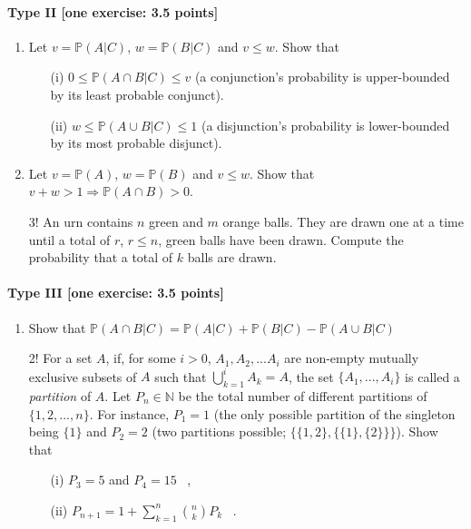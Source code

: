 \documentclass{article}
\begin{document}
\paragraph{Type II [one exercise: 3.5 points]}
\begin{enumerate}
	\item Let $v = \mathbb{P}(A|C)$, $w = \mathbb{P}(B|C)$ and $v \leq w$. Show that 
	\begin{itemize}
		\item [(i)] $0 \leq \mathbb{P}(A \cap B|C) \leq v$ (a conjunction's probability is upper-bounded by its least probable conjunct).	 \item[(ii)] $w \leq \mathbb{P}(A \cup B|C) \leq 1$ (a disjunction's probability is lower-bounded by its most probable disjunct).
	\end{itemize}
\item Let $v = \mathbb{P}(A)$, $w = \mathbb{P}(B)$ and $v \leq w$. Show that $v + w > 1 \Rightarrow \mathbb{P}(A \cap B) > 0$.
\item[3!] An urn contains $n$ green and $m$ orange balls. They are drawn one at a time until a total of $r$, $r \leq n$, green balls have been drawn. Compute the probability that a total of $k$ balls are drawn.

\end{enumerate}



\paragraph{Type III [one exercise: 3.5 points]}
\begin{enumerate}
	\item Show that $\mathbb{P}(A \cap B|C) = \mathbb{P}(A|C) + \mathbb{P}(B|C) - \mathbb{P}(A \cup B|C)$ %
	\item[2!] For a set $A$, if, for some $i > 0$, $A_1, A_2, ... A_i$ are non-empty mutually exclusive subsets of $A$ such that $\bigcup_{k=1}^{i}A_k = A$, the set $\{A_1, ..., A_i\}$ is called a \emph{partition} of $A$. Let $P_n \in \mathbb{N}$ be the total number of different partitions of $\{1,2,...,n\}$. For instance, $P_1 = 1$ (the only possible partition of the singleton being $\{1\}$ and $P_2 = 2$ (two partitions possible; $\{\{1,2\}, \{\{1\},\{2\}\}\}$). Show that
	\begin{itemize}
		\item[(i)] $P_3 = 5$ and $P_4 = 15$ \, ,
		\item[(ii)] $P_{n+1} = 1 + \sum_{k=1}^n \binom{n}{k}P_k$ \, .
	\end{itemize}

\end{enumerate}
\end{document}
